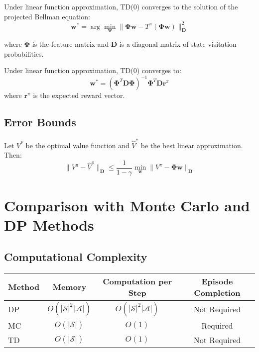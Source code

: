 Under linear function approximation, TD(0) converges to the solution of the projected Bellman equation:
\begin{equation}
\mathbf{w}^* = \arg\min_\mathbf{w} \|\boldsymbol{\Phi}\mathbf{w} - T^\pi(\boldsymbol{\Phi}\mathbf{w})\|_{\mathbf{D}}^2
\end{equation}

where $\boldsymbol{\Phi}$ is the feature matrix and $\mathbf{D}$ is a diagonal matrix of state visitation probabilities.

\begin{theorem}
Under linear function approximation, TD(0) converges to:
\begin{equation}
\mathbf{w}^* = (\boldsymbol{\Phi}^T \mathbf{D} \boldsymbol{\Phi})^{-1} \boldsymbol{\Phi}^T \mathbf{D} \mathbf{r}^\pi
\end{equation}
where $\mathbf{r}^\pi$ is the expected reward vector.
\end{theorem}

\subsection{Error Bounds}

\begin{theorem}
Let $V^*$ be the optimal value function and $\hat{V}^*$ be the best linear approximation. Then:
\begin{equation}
\|V^\pi - \hat{V}^\pi\|_{\mathbf{D}} \leq \frac{1}{1-\gamma} \min_\mathbf{w} \|V^\pi - \boldsymbol{\Phi}\mathbf{w}\|_{\mathbf{D}}
\end{equation}
\end{theorem}

\section{Comparison with Monte Carlo and DP Methods}

\subsection{Computational Complexity}

\begin{center}
\begin{tabular}{lccc}
\toprule
Method & Memory & Computation per Step & Episode Completion \\
\midrule
DP & $O(|\mathcal{S}|^2|\mathcal{A}|)$ & $O(|\mathcal{S}|^2|\mathcal{A}|)$ & Not Required \\
MC & $O(|\mathcal{S}|)$ & $O(1)$ & Required \\
TD & $O(|\mathcal{S}|)$ & $O(1)$ & Not Required \\
\bottomrule
\end{tabular}
\end{center}

